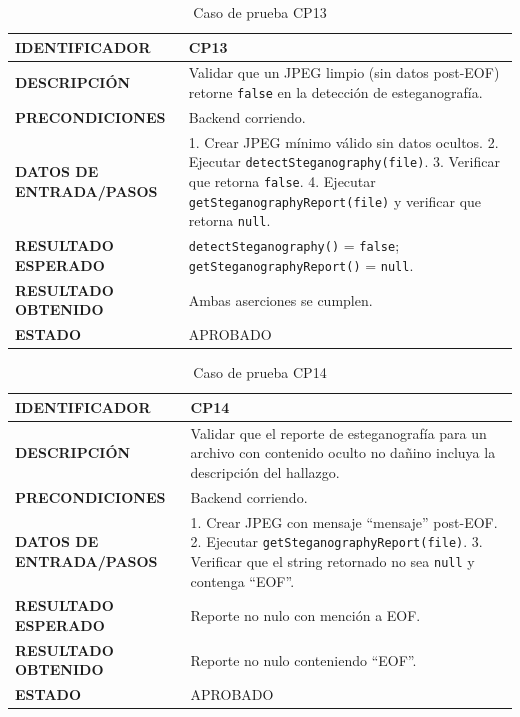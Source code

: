 \begin{table}[H]
\centering
\caption{Caso de prueba CP13}
\begin{tabular}{|p{3.5cm}|p{10.3cm}|}
\hline
\textbf{IDENTIFICADOR} & CP13 \\
\hline
\textbf{DESCRIPCIÓN} & Validar que un JPEG limpio (sin datos post-EOF) retorne \texttt{false} en la detección de esteganografía. \\
\hline
\textbf{PRECONDICIONES} & Backend corriendo. \\
\hline
\textbf{DATOS DE ENTRADA/PASOS} & 1. Crear JPEG mínimo válido sin datos ocultos. 2. Ejecutar \texttt{detectSteganography(file)}. 3. Verificar que retorna \texttt{false}. 4. Ejecutar \texttt{getSteganographyReport(file)} y verificar que retorna \texttt{null}. \\
\hline
\textbf{RESULTADO ESPERADO} & \texttt{detectSteganography()} = \texttt{false}; \texttt{getSteganographyReport()} = \texttt{null}. \\
\hline
\textbf{RESULTADO OBTENIDO} & Ambas aserciones se cumplen. \\
\hline
\textbf{ESTADO} & APROBADO \\
\hline
\end{tabular}
\end{table}

\begin{table}[H]
\centering
\caption{Caso de prueba CP14}
\begin{tabular}{|p{3.5cm}|p{10.3cm}|}
\hline
\textbf{IDENTIFICADOR} & CP14 \\
\hline
\textbf{DESCRIPCIÓN} & Validar que el reporte de esteganografía para un archivo con contenido oculto no dañino incluya la descripción del hallazgo. \\
\hline
\textbf{PRECONDICIONES} & Backend corriendo. \\
\hline
\textbf{DATOS DE ENTRADA/PASOS} & 1. Crear JPEG con mensaje ``mensaje'' post-EOF. 2. Ejecutar \texttt{getSteganographyReport(file)}. 3. Verificar que el string retornado no sea \texttt{null} y contenga ``EOF''. \\
\hline
\textbf{RESULTADO ESPERADO} & Reporte no nulo con mención a EOF. \\
\hline
\textbf{RESULTADO OBTENIDO} & Reporte no nulo conteniendo ``EOF''. \\
\hline
\textbf{ESTADO} & APROBADO \\
\hline
\end{tabular}
\end{table}

